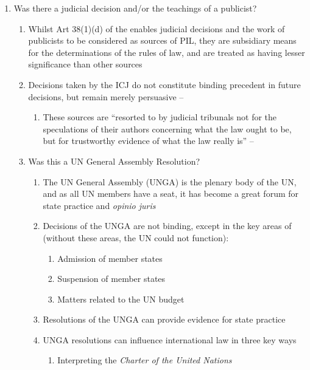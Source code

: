 \begin{enumerate}
\begin{enumerate}
    \end{enumerate}
    \item Was there a judicial decision and/or the teachings of a publicist?
    \begin{enumerate}
        \item Whilst Art 38(1)(d) of the  enables judicial decisions and the work of publicists to be considered as sources of PIL, they are subsidiary means for the determinations of the rules of law, and are treated as having lesser significance than other sources
        \item Decisions taken by the ICJ do not constitute binding precedent in future decisions, but remain merely persuasive -- 
        \begin{enumerate}
            \item These sources are ``resorted to by judicial tribunals not for the
            speculations of their authors concerning what the law ought to be, but for trustworthy
            evidence of what the law really is'' -- 
        \end{enumerate}
        \item Was this a UN General Assembly Resolution?
        \begin{enumerate}
            \item The UN General Assembly (UNGA) is the plenary body of the UN, and as all UN members have a seat, it has become a great forum for state practice and \textit{opinio juris}
            \item Decisions of the UNGA are not binding, except in the key areas of (without these areas, the UN could not function):
            \begin{enumerate}
                \item Admission of member states
                \item Suspension of member states
                \item Matters related to the UN budget
            \end{enumerate}
            \item Resolutions of the UNGA can provide evidence for state practice
            \item UNGA resolutions can influence international law in three key ways
            \begin{enumerate}
                \item Interpreting the \textit{Charter of the United Nations}

\end{enumerate}
\end{enumerate}
\end{enumerate}
\end{enumerate}
